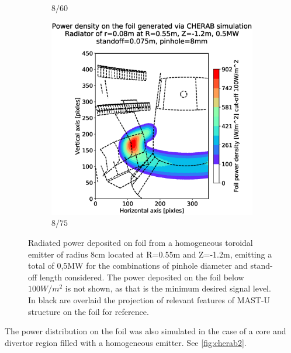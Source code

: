 \begin{figure}
\begin{subfigure}{0.32\textwidth}
         \caption{$8/60$}
         \label{fig:8_60}
     \end{subfigure}
     \hfill
     \begin{subfigure}{0.325\textwidth}
         \centering
         \includegraphics[trim={85 25 40 80},clip,width=\textwidth]{Chapters/chapter2/figs/measured_power_8_75radiator_R0.55_Z-1.2_r0.08.stl.eps}
         \caption{$8/75$}
         \label{fig:8_75}
     \end{subfigure}

    \caption{Radiated power deposited on foil from a homogeneous toroidal emitter of radius 8cm located at R=0.55m and Z=-1.2m, emitting a total of 0,5MW for the combinations of pinhole diameter and stand-off length considered. The power deposited on the foil below $100W/m^2$ is not shown, as that is the minimum desired signal level. In black are overlaid the projection of relevant features of MAST-U structure on the foil for reference.}
    \label{fig:cherab1}
\end{figure}

The power distribution on the foil was also simulated in the case of a core and divertor region filled with a homogeneous emitter.\cite{Federici2022} See \autoref{fig:cherab2}.

